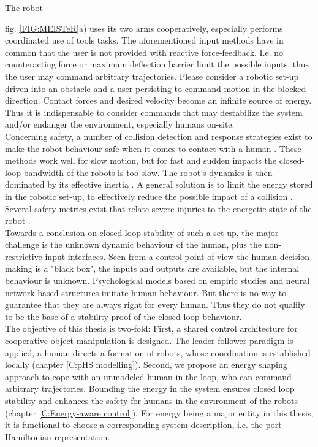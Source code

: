 \documentclass[a4paper,twoside, openright,12pt]{report}
\begin{document}
 The robot {fig. \ref{FIG:MEISTeR}a) uses its two arms cooperatively, especially performs coordinated use of tools tasks. The aforementioned input methods have in common that the user is not provided with reactive force-feedback. I.e. no counteracting force or maximum deflection barrier limit the possible inputs, thus the user may command arbitrary trajectories. Please consider a robotic set-up driven into an obstacle and a user persisting to command motion in the blocked direction. Contact forces and desired velocity become an infinite source of energy. Thus it is indispensable to consider commands that may destabilize the system and/or endanger the environment, especially humans on-site.\\
Concerning safety, a number of collision detection and response strategies exist to make the robot behaviour safe when it comes to contact with a human \cite{Haddadin_14}. These methods work well for slow motion, but for fast and sudden impacts the closed-loop bandwidth of the robots is too slow. The robot's dynamics is then dominated by its effective inertia \cite{Laffranchi_12}. A general solution is to limit the energy stored in the robotic set-up, to effectively reduce the possible impact of a collision \cite{Tadele_14}. Several safety metrics exist that relate severe injuries to the energetic state of the robot \cite{Wood_71,Yoganandan_96}.\\
Towards a conclusion on closed-loop stability of such a set-up, the major challenge is the unknown dynamic behaviour of the human, plus the non-restrictive input interfaces. Seen from a control point of view the human decision making is a "black box", the inputs and outputs are available, but the internal behaviour is unknown. Psychological models based on empiric studies and neural network based structures \cite{Peters_15} imitate human behaviour. But there is no way to guarantee that they are always right for every human. Thus they do not qualify to be the base of a stability proof of the closed-loop behaviour.\\
The objective of this thesis is two-fold: First, a shared control architecture for cooperative object manipulation is designed. The leader-follower paradigm is applied, a human directs a formation of robots, whose coordination is established locally (chapter \ref{C:pHS modelling}). Second, we propose an energy shaping approach to cope with an unmodeled human in the loop, who can command arbitrary trajectories. Bounding the energy in the system ensures closed loop stability and enhances the safety for humans in the environment of the robots (chapter \ref{C:Energy-aware control}).
For energy being a major entity in this thesis, it is functional to choose a corresponding system description, i.e. the port-Hamiltonian representation.

}
\end{document}
